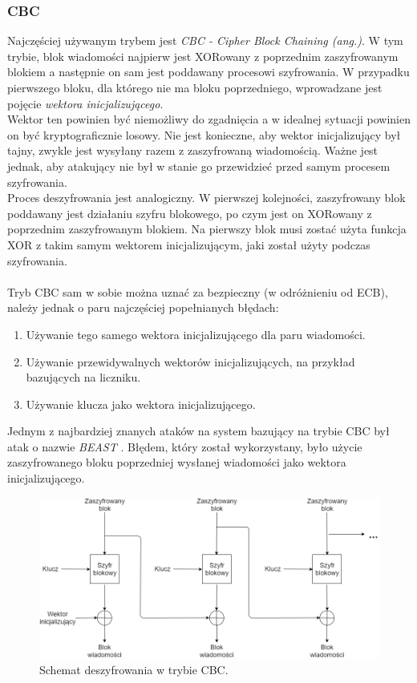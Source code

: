 \subsubsection{CBC}
Najczęściej używanym trybem jest \textit{CBC - Cipher Block Chaining (ang.)}. 
W tym trybie, blok wiadomości najpierw jest XORowany z poprzednim zaszyfrowanym blokiem a następnie
on sam jest poddawany procesowi szyfrowania. W przypadku pierwszego bloku, dla którego nie ma bloku poprzedniego, 
wprowadzane jest pojęcie \textit{wektora inicjalizującego}. \\ 
Wektor ten powinien być niemożliwy do zgadnięcia a w idealnej sytuacji powinien on być kryptograficznie losowy. Nie jest konieczne, aby wektor inicjalizujący był tajny, zwykle jest wysyłany razem z zaszyfrowaną wiadomością. Ważne jest jednak, aby atakujący nie był w stanie go przewidzieć przed samym procesem szyfrowania. \\ 
Proces deszyfrowania jest analogiczny. W pierwszej kolejności, zaszyfrowany blok poddawany jest działaniu szyfru 
blokowego, po czym jest on XORowany z poprzednim zaszyfrowanym blokiem. Na pierwszy blok musi zostać użyta funkcja XOR
z takim samym wektorem inicjalizującym, jaki został użyty podczas szyfrowania. \\\\
Tryb CBC sam w sobie można uznać za bezpieczny (w odróżnieniu od ECB), 
należy jednak o paru najczęściej popełnianych błędach:
\begin{enumerate}
	\item Używanie tego samego wektora inicjalizującego dla paru wiadomości.
	\item Używanie przewidywalnych wektorów inicjalizujących, na przykład bazujących na liczniku.
	\item Używanie klucza jako wektora inicjalizującego. 
\end{enumerate}
Jednym z najbardziej znanych ataków na system bazujący na trybie CBC był atak o nazwie \textit{BEAST} \cite{beast}. 
Błędem, który został wykorzystany, było użycie zaszyfrowanego bloku poprzedniej wysłanej wiadomości jako wektora inicjalizującego.
\begin{figure}
    \centering
	\includegraphics[width=\textwidth]{content/images/cbc-dec-scheme}
    \caption{Schemat deszyfrowania w trybie CBC.}
\end{figure}
